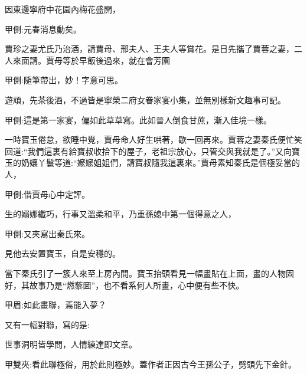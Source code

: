 \begin{parag}
\end{parag}


\begin{parag}
    因東邊寧府中花園內梅花盛開，\begin{note}甲側:元春消息動矣。\end{note}賈珍之妻尤氏乃治酒，請賈母、邢夫人、王夫人等賞花。是日先攜了賈蓉之妻，二人來面請。賈母等於早飯後過來，就在會芳園\begin{note}甲側:隨筆帶出，妙！字意可思。\end{note}遊頑，先茶後酒，不過皆是寧榮二府女眷家宴小集，並無別樣新文趣事可記。\begin{note}甲側:這是第一家宴，偏如此草草寫。此如晉人倒食甘蔗，漸入佳境一樣。\end{note}
\end{parag}


\begin{parag}
    一時寶玉倦怠，欲睡中覺，賈母命人好生哄著，歇一回再來。賈蓉之妻秦氏便忙笑回道:“我們這裏有給寶叔收拾下的屋子，老祖宗放心，只管交與我就是了。”又向寶玉的奶孃丫鬟等道:“嬤嬤姐姐們，請寶叔隨我這裏來。”賈母素知秦氏是個極妥當的人，\begin{note}甲側:借賈母心中定評。\end{note}生的嫋娜纖巧，行事又溫柔和平，乃重孫媳中第一個得意之人，\begin{note}甲側:又夾寫出秦氏來。\end{note}見他去安置寶玉，自是安穩的。
\end{parag}


\begin{parag}
    當下秦氏引了一簇人來至上房內間。寶玉抬頭看見一幅畫貼在上面，畫的人物固好，其故事乃是“燃藜圖”，也不看系何人所畫，心中便有些不快。\begin{note}甲眉:如此畫聯，焉能入夢？\end{note}又有一幅對聯，寫的是:
\end{parag}


\begin{poem}
    \begin{pl}世事洞明皆學問，人情練達即文章。\end{pl}
    \begin{note}甲雙夾:看此聯極俗，用於此則極妙。蓋作者正因古今王孫公子，劈頭先下金針。\end{note}
\end{poem}


